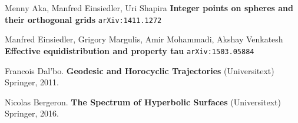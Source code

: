 \documentclass[12pt]{article}
\begin{document}
\selectfont \fontsize{12.5}{15}\selectfont


\begin{thebibliography}{} 

\item Menny Aka, Manfred Einsiedler, Uri Shapira \textbf{Integer points on spheres and their orthogonal grids} \texttt{arXiv:1411.1272}

\item Manfred Einsiedler, Grigory Margulis, Amir Mohammadi, Akshay Venkatesh \textbf{Effective equidistribution and property tau} \texttt{arXiv:1503.05884}


\item Francois Dal'bo. \textbf{Geodesic and Horocyclic Trajectories} (Universitext) Springer, 2011.

\item Nicolas Bergeron. \textbf{The Spectrum of Hyperbolic Surfaces} (Universitext) Springer, 2016.



\end{thebibliography}
\end{document}
